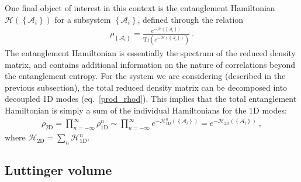 One final object of interest in this context is the entanglement Hamiltonian \(\mathcal{H}(\left\{ \mathcal{A}_i\right\})\) for a subsystem \(\left\{ \mathcal{A}_i\right\}\), defined through the relation~\cite{li2008entanglement,CalabreseLefevre2008}
\begin{equation}\begin{aligned}\label{ent_Ham}
	\rho_{\left\{ \mathcal{A}_i\right\}} = \frac{e^{-\mathcal{H}(\left\{ \mathcal{A}_i\right\})}}{\text{Tr}\left( e^{-\mathcal{H}(\left\{ \mathcal{A}_i\right\})} \right) }~.
\end{aligned}\end{equation}
The entanglement Hamiltonian is essentially the spectrum of the reduced density matrix, and contains additional information on the nature of correlations beyond the entanglement entropy. For the system we are considering (described in the previous subsection), the total reduced density matrix can be decomposed into decoupled 1D modes (eq.~\eqref{prod_rhod}). This implies that the total entanglement Hamiltonian is simply a sum of the individual Hamiltonians for the 1D modes:
\begin{equation}\begin{aligned}\label{ent_ham_2d}
	\rho_\text{2D} = \prod_{n=-\infty}^\infty \rho^n_\text{1D} \sim \prod_{n=-\infty}^\infty e^{-\mathcal{H}^n_\text{1D}(\left\{ \mathcal{A}_i\right\})} = e^{-\mathcal{H}_\text{2D}(\left\{ \mathcal{A}_i\right\})}~,
\end{aligned}\end{equation}
where \(\mathcal{H}_\text{2D} = \sum_n\mathcal{H}^n_\text{1D}\).


\subsection{Luttinger volume}

